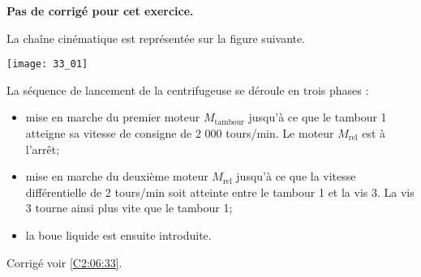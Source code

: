 \normaltrue \difficilefalse \tdifficilefalse
\correctiontrue


\setcounter{question}{0}

\ifcorrection
\else
\textbf{Pas de corrigé pour cet exercice.}
\fi

\ifprof
\else

La chaîne cinématique est représentée sur la figure
suivante.
\begin{center}
\texttt{[image: 33\_01]}
\end{center}


La séquence de lancement de la centrifugeuse se déroule en trois phases :
\begin{itemize}
\item mise en marche du premier moteur $M_{\text{tambour}}$ jusqu’à ce que le tambour 1 atteigne sa vitesse
de consigne de 2 000 tours/min. Le moteur $M_{\text{rel}}$ est à l’arrêt;
\item mise en marche du deuxième moteur $M_{\text{rel}}$ jusqu’à ce que la vitesse différentielle de
2 tours/min soit atteinte entre le tambour 1 et la vis 3. La vis 3 tourne ainsi plus vite que le
tambour 1;
\item la boue liquide est ensuite introduite.
\end{itemize}
\fi


\ifprof
\else
\fi

\ifprof
\else
\begin{flushright}
\footnotesize{Corrigé  voir \ref{C2:06:33}.}
\end{flushright}%
\fi
